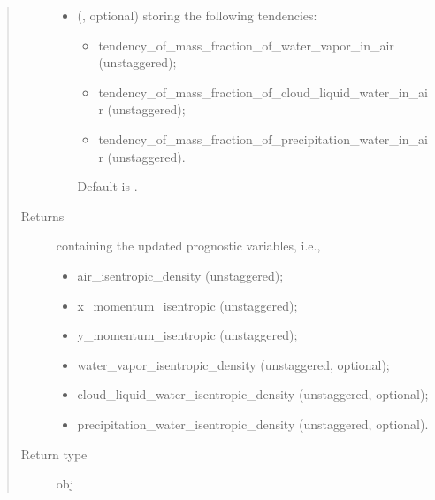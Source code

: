 \documentclass[letterpaper,10pt,english]{sphinxmanual}
\begin{document}
\begin{fulllineitems}
\begin{fulllineitems}
\begin{quote}
\begin{description}
\begin{itemize}
\begin{itemize}
\end{itemize}


\item {} 
 (, optional) \textendash{} 
{\hyperref[\detokenize{api:tasmania.storages.grid_data.GridData}]{}} storing the following tendencies:
\begin{itemize}
\item {} 
tendency\_of\_mass\_fraction\_of\_water\_vapor\_in\_air (unstaggered);

\item {} 
tendency\_of\_mass\_fraction\_of\_cloud\_liquid\_water\_in\_air (unstaggered);

\item {} 
tendency\_of\_mass\_fraction\_of\_precipitation\_water\_in\_air (unstaggered).

\end{itemize}

Default is .


\end{itemize}

\item[{Returns}] \leavevmode

{\hyperref[\detokenize{api:tasmania.storages.state_isentropic.StateIsentropic}]{}} containing the updated prognostic variables, i.e.,
\begin{itemize}
\item {} 
air\_isentropic\_density (unstaggered);

\item {} 
x\_momentum\_isentropic (unstaggered);

\item {} 
y\_momentum\_isentropic (unstaggered);

\item {} 
water\_vapor\_isentropic\_density (unstaggered, optional);

\item {} 
cloud\_liquid\_water\_isentropic\_density (unstaggered, optional);

\item {} 
precipitation\_water\_isentropic\_density (unstaggered, optional).

\end{itemize}


\item[{Return type}] \leavevmode
obj

\end{description}\end{quote}

\end{fulllineitems}


\end{fulllineitems}
\end{document}
